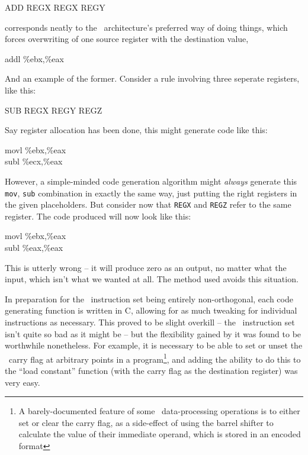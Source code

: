 \begin{code}
ADD REGX REGX REGY
\end{code}

corresponds neatly to the \ia\ architecture's preferred way of doing things, which forces overwriting of one source register with the destination value,

\begin{code}
addl \%ebx,\%eax
\end{code}

And an example of the former. Consider a rule involving three seperate registers, like this:

\begin{code}
SUB REGX REGY REGZ
\end{code}

Say register allocation has been done, this might generate code like this:

\begin{code}
movl \%ebx,\%eax\\
subl \%ecx,\%eax
\end{code}

However, a simple-minded code generation algorithm might {\it always} generate this {\tt mov}, {\tt sub} combination in exactly the same way, just putting the right registers in the given placeholders. But consider now that {\tt REGX} and {\tt REGZ} refer to the same register. The code produced will now look like this:

\begin{code}
movl \%ebx,\%eax\\
subl \%eax,\%eax
\end{code}

This is utterly wrong -- it will produce zero as an output, no matter what the input, which isn't what we wanted at all. The method used avoids this situation.

In preparation for the \ia\ instruction set being entirely non-orthogonal, each code generating function is written in C, allowing for as much tweaking for individual instructions as necessary. This proved to be slight overkill -- the \ia\ instruction set isn't quite so bad as it might be -- but the flexibility gained by it was found to be worthwhile nonetheless. For example, it is necessary to be able to set or unset the \ia\ carry flag at arbitrary points in a program\footnote{A barely-documented feature of some \arm\ data-processing operations is to either set or clear the carry flag, as a side-effect of using the barrel shifter to calculate the value of their immediate operand, which is stored in an encoded format}, and adding the ability to do this to the ``load constant'' function (with the carry flag as the destination register) was very easy.

